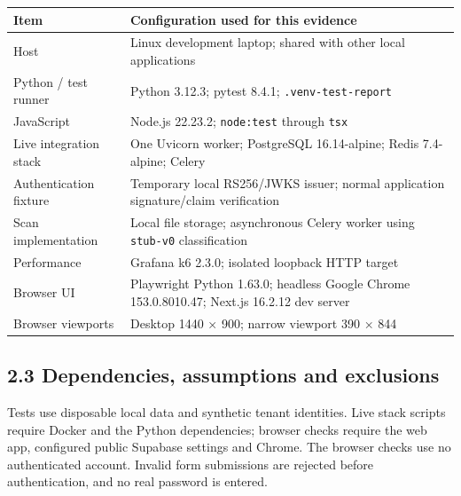 \documentclass[
  11pt,
]{article}
\newcounter{none} %
\begin{document}
{\def\LTcaptype{none} %
\begin{longtable}[]{@{}
  >{\raggedright\arraybackslash}p{}
  >{\raggedright\arraybackslash}p{}@{}}
\toprule\noalign{}
\begin{minipage}[b]{\linewidth}\raggedright
Item
\end{minipage} & \begin{minipage}[b]{\linewidth}\raggedright
Configuration used for this evidence
\end{minipage} \\
\midrule\noalign{}
\endhead
\bottomrule\noalign{}
\endlastfoot
Host & Linux development laptop; shared with other local applications \\
Python / test runner & Python 3.12.3; pytest 8.4.1;
\texttt{.venv-test-report} \\
JavaScript & Node.js 22.23.2; \texttt{node:test} through \texttt{tsx} \\
Live integration stack & One Uvicorn worker; PostgreSQL 16.14-alpine;
Redis 7.4-alpine; Celery \\
Authentication fixture & Temporary local RS256/JWKS issuer; normal
application signature/claim verification \\
Scan implementation & Local file storage; asynchronous Celery worker
using \texttt{stub-v0} classification \\
Performance & Grafana k6 2.3.0; isolated loopback HTTP target \\
Browser UI & Playwright Python 1.63.0; headless Google Chrome
153.0.8010.47; Next.js 16.2.12 dev server \\
Browser viewports & Desktop 1440 × 900; narrow viewport 390 × 844 \\
\end{longtable}
}

\subsection{2.3 Dependencies, assumptions and
exclusions}\label{dependencies-assumptions-and-exclusions}

Tests use disposable local data and synthetic tenant identities. Live
stack scripts require Docker and the Python dependencies; browser checks
require the web app, configured public Supabase settings and Chrome. The
browser checks use no authenticated account. Invalid form submissions
are rejected before authentication, and no real password is entered.
\end{document}
